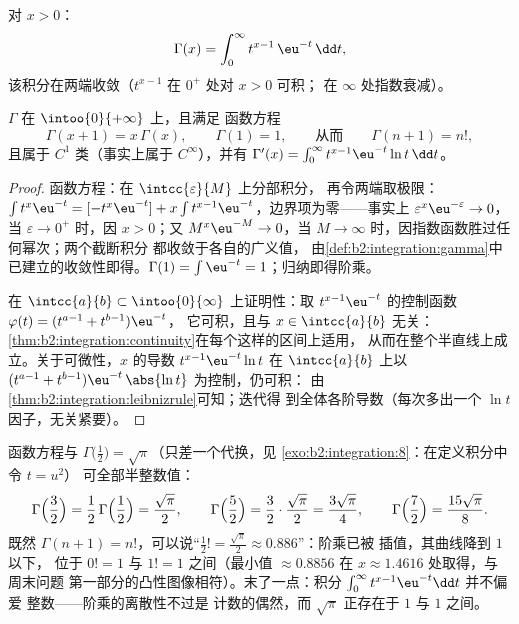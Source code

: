 \begin{definition}[$\Gamma$ 函数]\label{def:b2:integration:gamma}
对 $x > 0$：
\[
\Gamma(x) = \int_0^{\infty} t^{x-1}\,\eu^{-t}\,\dd t ,
\]
该积分在两端收敛（$t^{x-1}$ 在 $0^+$ 处对 $x > 0$ 可积；
在 $\infty$ 处指数衰减）。
\end{definition}

\begin{theorem}\label{thm:b2:integration:gammaprops}
$\Gamma$ 在 $\intoo{0}{+\infty}$ 上，且满足
函数方程
\[
\Gamma(x + 1) = x\,\Gamma(x),
\qquad \Gamma(1) = 1,
\qquad\text{从而}\qquad \Gamma(n + 1) = n! ,
\]
且属于 $C^1$ 类（事实上属于 $C^\infty$），并有 $\Gamma'(x) =
\int_0^\infty t^{x-1}\eu^{-t}\ln t\,\dd t$。
\end{theorem}

\begin{proof}
函数方程：在 $\intcc{\varepsilon}{M}$ 上分部积分，
再令两端取极限：$\int t^{x}\eu^{-t} = [-t^x\eu^{-t}] + x\int
t^{x-1}\eu^{-t}$，边界项为零——事实上
$\varepsilon^x\eu^{-\varepsilon} \to 0$，当 $\varepsilon \to
0^+$ 时，因 $x > 0$；又 $M^x\eu^{-M} \to 0$，当 $M \to \infty$
时，因指数函数胜过任何幂次；两个截断积分
都收敛于各自的广义值，
由\cref{def:b2:integration:gamma}中已建立的收敛性即得。$\Gamma(1) = \int
\eu^{-t} = 1$；归纳即得阶乘。

在 $\intcc{a}{b} \subset \intoo{0}{\infty}$ 上证明性：取
$t^{x-1}\eu^{-t}$ 的控制函数 $\varphi(t) = (t^{a-1} + t^{b-1})\eu^{-t}$，
它可积，且与 $x \in \intcc{a}{b}$ 无关：
\cref{thm:b2:integration:continuity}在每个这样的区间上适用，
从而在整个半直线上成立。关于可微性，$x$ 的导数
$t^{x-1}\eu^{-t}\ln t$ 在 $\intcc{a}{b}$ 上以 $(t^{a-1}
+ t^{b-1})\eu^{-t}\,\abs{\ln t}$ 为控制，仍可积：
由\cref{thm:b2:integration:leibnizrule}可知；迭代得
到全体各阶导数（每次多出一个 $\ln t$ 因子，无关紧要）。
\end{proof}

\begin{example}[半整数阶乘]\label{ex:b2:integration:halffactorial}
函数方程与 $\Gamma\bigl(\frac12\bigr) =
\sqrt\pi$（只差一个代换，见
\cref{exo:b2:integration:8}：在定义积分中令 $t = u^2$）
可全部半整数值：
\[
\Gamma\Bigl(\frac32\Bigr) = \frac12\,\Gamma\Bigl(\frac12\Bigr)
= \frac{\sqrt\pi}{2},
\qquad
\Gamma\Bigl(\frac52\Bigr) = \frac32\cdot\frac{\sqrt\pi}{2}
= \frac{3\sqrt\pi}{4},
\qquad
\Gamma\Bigl(\frac72\Bigr) = \frac{15\sqrt\pi}{8} .
\]
既然 $\Gamma(n+1) = n!$，可以说“$\frac12! =
\frac{\sqrt\pi}{2} \approx 0.886$”：阶乘已被
插值，其曲线降到 $1$ 以下，
位于 $0! = 1$ 与 $1! = 1$ 之间（最小值 $\approx 0.8856$ 在
$x \approx 1.4616$ 处取得，与周末问题
第一部分的凸性图像相符）。末了一点：积分
$\int_0^\infty t^{x-1}\eu^{-t}\dd t$ 并不偏爱
整数——阶乘的离散性不过是
计数的偶然，而 $\sqrt\pi$ 正存在于 $1$ 与 $1$ 之间。
\end{example}

